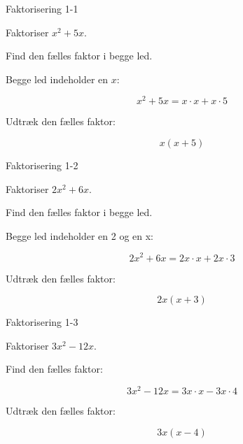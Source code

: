 \documentclass{article}
\begin{document}

\tableofcontents
\newpage

\begin{exercise}{Faktorisering 1-1}

Faktoriser $x^2 + 5x$.


\hint

Find den fælles faktor i begge led.

\hint

Begge led indeholder en $x$:

\hint
\[
x^2 + 5x = x \cdot x + x \cdot 5
\]

\hint

Udtræk den fælles faktor:

\hint
\[
x(x + 5)
\]

\end{exercise}

\newpage

\begin{exercise}{Faktorisering 1-2}

Faktoriser $2x^2 + 6x$.


\hint

Find den fælles faktor i begge led.

\hint

Begge led indeholder en 2 og en x:

\hint
\[
2x^2 + 6x = 2x \cdot x + 2x \cdot 3
\]

\hint

Udtræk den fælles faktor:

\hint
\[
2x(x + 3)
\]

\end{exercise}

\newpage

\begin{exercise}{Faktorisering 1-3}

Faktoriser $3x^2 - 12x$.


\hint

Find den fælles faktor:

\hint
\[
3x^2 - 12x = 3x \cdot x - 3x \cdot 4
\]

\hint

Udtræk den fælles faktor:

\hint
\[
3x(x - 4)
\]

\end{exercise}
\end{document}
